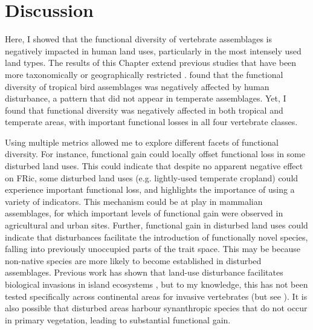 \clearpage
\section{Discussion}
Here, I showed that the functional diversity of vertebrate assemblages is negatively impacted in human land uses, particularly in the most intensely used land types. The results of this Chapter extend previous studies that have been more taxonomically or geographically restricted \citep{Flynn2009, Matuoka2020}. \citet{Matuoka2020} found that the functional diversity of tropical bird assemblages was negatively affected by human disturbance, a pattern that did not appear in temperate assemblages. Yet, I found that functional diversity was negatively affected in both tropical and temperate areas, with important functional losses in all four vertebrate classes.

Using multiple metrics allowed me to explore different facets of functional diversity. For instance, functional gain could locally offset functional loss in some disturbed land uses. This could indicate that despite no apparent negative effect on FRic, some disturbed land uses (e.g. lightly-used temperate cropland) could experience important functional loss, and highlights the importance of using a variety of indicators. This mechanism could be at play in mammalian assemblages, for which important levels of functional gain were observed in agricultural and urban sites. Further, functional gain in disturbed land uses could indicate that disturbances facilitate the introduction of functionally novel species, falling into previously unoccupied parts of the trait space. This may be because non-native species are more likely to become established in disturbed assemblages. Previous work has shown that land-use disturbance facilitates biological invasions in island ecosystems \citep{Jesse2018,Sanchez-Ortiz2019}, but to my knowledge, this has not been tested specifically across continental areas for invasive vertebrates (but see \citet{Pysek2010}). It is also possible that disturbed areas harbour synanthropic species that do not occur in primary vegetation, leading to substantial functional gain.

